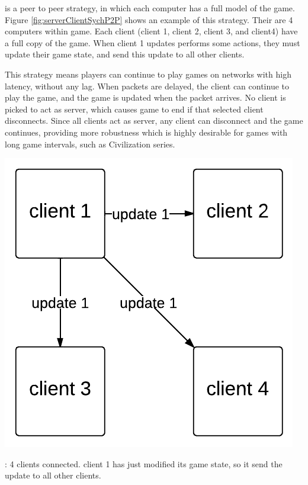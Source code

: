 \emph{\stepOneName} is a peer to peer strategy, in which each computer has a full model of the game. Figure \ref{fig:serverClientSychP2P} shows an example of this strategy. 
Their are 4 computers within game. Each client (client 1, client 2, client 3, and client4) have a full copy of the game.
When client 1 updates performs some actions, they must update their game state, and send this update to all other clients.

This strategy means players can continue to play games on networks with high latency, without any lag. When packets are delayed, the client can continue to play the game, and the game is updated when the packet arrives.
No client is picked to act as server, which causes game to end if that selected client disconnects.
Since all clients act as server, any client can disconnect and the game continues, providing more robustness which is highly desirable for games with long game intervals, such as Civilization series\cite{civilizationInMyPants}.



\begin{marginfigure}
	\includegraphics{res/computer_communication_architecture/ServerClientSynchronizationP2P.pdf}
	\caption{
	\stepOneName : 4 clients connected. client 1 has just modified its game state, so it send the update to all other clients.
	}
	\label{fig:serverClientSychP2P}
\end{marginfigure}

